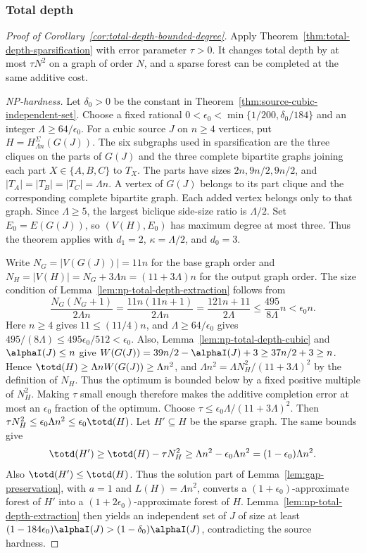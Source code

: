 \subsubsection{Total depth}
\label{app:bounded-degree-total-depth}

\begin{proof}[Proof of Corollary~\ref{cor:total-depth-bounded-degree}]
Apply Theorem~\ref{thm:total-depth-sparsification} with error
parameter $\tau>0$. It changes total depth by at most $\tau N^2$
on a graph of order $N$, and a sparse forest can be completed at
the same additive cost.

\emph{NP-hardness.}
Let $\delta_0>0$ be the constant in
Theorem~\ref{thm:source-cubic-independent-set}.
Choose a fixed rational
$0<\epsilon_0<\min\{1/200,\delta_0/184\}$ and an integer
$\Lambda\ge64/\epsilon_0$. For a cubic source $J$ on $n\ge4$ vertices,
put $H=H^{\Sigma}_{\Lambda n}(G(J))$. The six subgraphs used in sparsification
are the three cliques on the parts of $G(J)$ and the three complete
bipartite graphs joining each part $X\in\{A,B,C\}$ to $T_X$. The
parts have sizes $2n,9n/2,9n/2$, and
$|T_A|=|T_B|=|T_C|=\Lambda n$. A vertex
of $G(J)$ belongs to its part clique and the corresponding complete
bipartite graph. Each added vertex belongs only to that graph. Since
$\Lambda\ge5$,
the largest biclique side-size ratio is $\Lambda/2$.
Set $E_0=E(G(J))$, so $(V(H),E_0)$ has maximum degree at most three.
Thus the theorem applies
with $d_1=2$, $\kappa=\Lambda/2$, and $d_0=3$.

Write $N_G=|V(G(J))|=11n$ for the base graph order and
$N_H=|V(H)|=N_G+3\Lambda n=(11+3\Lambda)n$ for the output graph order. The size condition of
Lemma~\ref{lem:np-total-depth-extraction} follows from
\[
 \frac{N_G(N_G+1)}{2\Lambda n}=\frac{11n(11n+1)}{2\Lambda n}
 =\frac{121n+11}{2\Lambda}
 \leq\frac{495}{8\Lambda}n<\epsilon_0n.
\]
Here $n\ge4$ gives $11\le(11/4)n$, and
$\Lambda\ge64/\epsilon_0$ gives
$495/(8\Lambda)\le495\epsilon_0/512<\epsilon_0$.
Also, Lemma~\ref{lem:np-total-depth-cubic} and $\alphaI(J)\le n$ give
$W(G(J))=39n/2-\alphaI(J)+3\ge37n/2+3\ge n$. Hence
$\totd(H)\ge\Lambda nW(G(J))\ge\Lambda n^2$, and
$\Lambda n^2=\Lambda N_H^2/(11+3\Lambda)^2$ by the definition of $N_H$.
Thus the optimum is bounded below by a fixed positive multiple of
$N_H^2$. Making $\tau$ small enough therefore makes the additive
completion error at most an $\epsilon_0$ fraction of the optimum.
Choose $\tau\le\epsilon_0\Lambda/(11+3\Lambda)^2$. Then
$\tau N_H^2\le\epsilon_0\Lambda n^2\le\epsilon_0\totd(H)$.
Let $H'\subseteq H$ be the sparse graph. The same bounds give
\[
 \totd(H')\ge\totd(H)-\tau N_H^2
 \ge\Lambda n^2-\epsilon_0\Lambda n^2
 =(1-\epsilon_0)\Lambda n^2.
\]
Also $\totd(H')\le\totd(H)$. Thus the solution part of
Lemma~\ref{lem:gap-preservation}, with $a=1$ and
$L(H)=\Lambda n^2$, converts a $(1+\epsilon_0)$-approximate forest
of $H'$ into a $(1+2\epsilon_0)$-approximate forest of $H$.
Lemma~\ref{lem:np-total-depth-extraction} then yields an independent
set of $J$ of size at least
$(1-184\epsilon_0)\alphaI(J)>(1-\delta_0)\alphaI(J)$, contradicting
the source hardness.


\end{proof}
